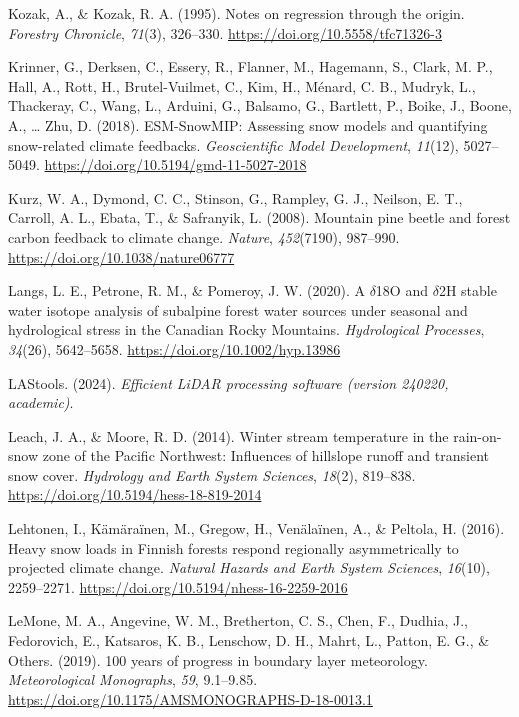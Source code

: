 \documentclass[
  letterpaper,
]{tex/uofsthesis-cs}
\newlength{\cslhangindent}
\newenvironment{CSLReferences}[2] %
 {\begin{list}{}{%
  \setlength{\itemindent}{0pt}
  \setlength{\leftmargin}{0pt}
  \setlength{\parsep}{0pt}
  \ifodd #1
   \setlength{\leftmargin}{\cslhangindent}
   \setlength{\itemindent}{-1\cslhangindent}
  \fi
  \setlength{\itemsep}{#2\baselineskip}}}
 {\end{list}}
\begin{document}
\begin{CSLReferences}{1}{0}
Kozak, A., \& Kozak, R. A. (1995). Notes on regression through the
origin. \emph{Forestry Chronicle}, \emph{71}(3), 326--330.
\url{https://doi.org/10.5558/tfc71326-3}

Krinner, G., Derksen, C., Essery, R., Flanner, M., Hagemann, S., Clark,
M. P., Hall, A., Rott, H., Brutel-Vuilmet, C., Kim, H., Ménard, C. B.,
Mudryk, L., Thackeray, C., Wang, L., Arduini, G., Balsamo, G., Bartlett,
P., Boike, J., Boone, A., \ldots{} Zhu, D. (2018). {ESM-SnowMIP}:
{Assessing} snow models and quantifying snow-related climate feedbacks.
\emph{Geoscientific Model Development}, \emph{11}(12), 5027--5049.
\url{https://doi.org/10.5194/gmd-11-5027-2018}

Kurz, W. A., Dymond, C. C., Stinson, G., Rampley, G. J., Neilson, E. T.,
Carroll, A. L., Ebata, T., \& Safranyik, L. (2008). Mountain pine beetle
and forest carbon feedback to climate change. \emph{Nature},
\emph{452}(7190), 987--990. \url{https://doi.org/10.1038/nature06777}

Langs, L. E., Petrone, R. M., \& Pomeroy, J. W. (2020). A
{\(\delta\)18O} and {\(\delta\)2H} stable water isotope analysis of
subalpine forest water sources under seasonal and hydrological stress in
the {Canadian Rocky Mountains}. \emph{Hydrological Processes},
\emph{34}(26), 5642--5658. \url{https://doi.org/10.1002/hyp.13986}

LAStools. (2024). \emph{Efficient {LiDAR} processing software (version
240220, academic)}.

Leach, J. A., \& Moore, R. D. (2014). Winter stream temperature in the
rain-on-snow zone of the {Pacific Northwest}: Influences of hillslope
runoff and transient snow cover. \emph{Hydrology and Earth System
Sciences}, \emph{18}(2), 819--838.
\url{https://doi.org/10.5194/hess-18-819-2014}

Lehtonen, I., Kämäraïnen, M., Gregow, H., Venälaïnen, A., \& Peltola, H.
(2016). Heavy snow loads in {Finnish} forests respond regionally
asymmetrically to projected climate change. \emph{Natural Hazards and
Earth System Sciences}, \emph{16}(10), 2259--2271.
\url{https://doi.org/10.5194/nhess-16-2259-2016}

LeMone, M. A., Angevine, W. M., Bretherton, C. S., Chen, F., Dudhia, J.,
Fedorovich, E., Katsaros, K. B., Lenschow, D. H., Mahrt, L., Patton, E.
G., \& Others. (2019). 100 years of progress in boundary layer
meteorology. \emph{Meteorological Monographs}, \emph{59}, 9.1--9.85.
\url{https://doi.org/10.1175/AMSMONOGRAPHS-D-18-0013.1}


\end{CSLReferences}
\end{document}
